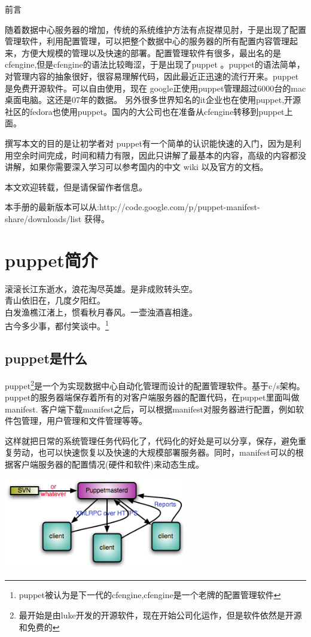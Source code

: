 \newpage
\begin{center}
\msyh 前言
\end{center}
\fsong
\par
随着数据中心服务器的增加，传统的系统维护方法有点捉襟见肘，于是出现了配置管理软件，利用配置管理，可以把整个数据中心的服务器的所有配置内容管理起来，方便大规模的管理以及快速的部署。配置管理软件有很多，最出名的是cfengine,但是cfengine的语法比较晦涩，于是出现了puppet  。puppet的语法简单，对管理内容的抽象很好，很容易理解代码，因此最近正迅速的流行开来。puppet是免费开源软件。可以自由使用，现在 google正使用puppet管理超过6000台的mac桌面电脑。这还是07年的数据。 另外很多世界知名的it企业也在使用puppet,开源社区的fedora也使用puppet。国内的大公司也在准备从cfengine转移到puppet上面。\par
撰写本文的目的是让初学者对 puppet有一个简单的认识能快速的入门，因为是利用空余时间完成，时间和精力有限，因此只讲解了最基本的内容，高级的内容都没讲解，如果你需要深入学习可以参考国内的中文 wiki 以及官方的文档。\par
本文欢迎转载，但是请保留作者信息。\par
本手册的最新版本可以从:http://code.google.com/p/puppet-manifest-share/downloads/list 获得。
\song
\newpage
\chapter{\msyh puppet简介}
\begin{center}
\kai
\small
滚滚长江东逝水，浪花淘尽英雄。是非成败转头空。\\
青山依旧在，几度夕阳红。 \\
白发渔樵江渚上，惯看秋月春风。一壶浊酒喜相逢。\\
古今多少事，都付笑谈中。\footnote{\fsong \tiny puppet被认为是下一代的cfengine,cfengine是一个老牌的配置管理软件}
\end{center}

\song
\section{\msyh puppet是什么}

puppet\footnote{\fsong\tiny 最开始是由luke开发的开源软件，现在开始公司化运作，但是软件依然是开源和免费的}是一个为实现数据中心自动化管理而设计的配置管理软件。基于c/s架构。puppet的服务器端保存着所有的对客户端服务器的配置代码，在puppet里面叫做manifest. 客户端下载manifest之后，可以根据manifest对服务器进行配置，例如软件包管理，用户管理和文件管理等等。
\par
这样就把日常的系统管理任务代码化了，代码化的好处是可以分享，保存，避免重复劳动，也可以快速恢复以及快速的大规模部署服务器。同时，manifest可以的根据客户端服务器的配置情况(硬件和软件)来动态生成。
\begin{center}
\includegraphics[width=0.6\textwidth]{Puppet_Star.png}
\end{center}


